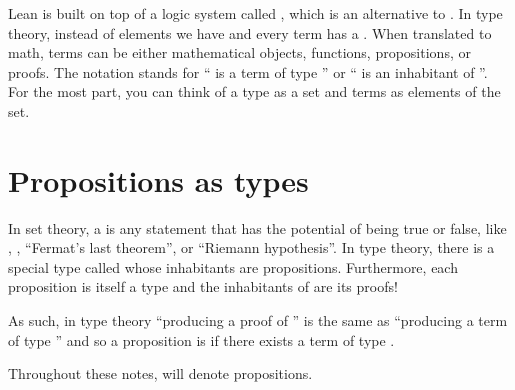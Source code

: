 \documentclass[letterpaper,10pt,english]{sphinxmanual}
\begin{document}
\sphinxAtStartPar
Lean is built on top of a logic system called , which is an alternative to .
In type theory, instead of elements we have  and every term has a .
When translated to math, terms can be either mathematical objects, functions, propositions, or proofs.
The notation  stands for “ is a term of type ” or “ is an inhabitant of ”.
For the most part, you can think of a type as a set and terms as elements of the set.


\section{Propositions as types}
\label{\detokenize{day1:propositions-as-types}}
\sphinxAtStartPar
In set theory, a  is any statement that has the potential of being true or false, like , , “Fermat’s last theorem”, or “Riemann hypothesis”.
In type theory, there is a special type called  whose inhabitants are propositions.
Furthermore, each proposition  is itself a type and the inhabitants of  are its proofs!

\begin{sphinxVerbatim}[commandchars=\\\{\}]
           
               
\end{sphinxVerbatim}

\sphinxAtStartPar
As such, in type theory “producing a proof of ” is the same as “producing a term of type ”
and so a proposition  is  if there exists a term  of type .

\sphinxAtStartPar
{} Throughout these notes,  will denote propositions.
\end{document}
